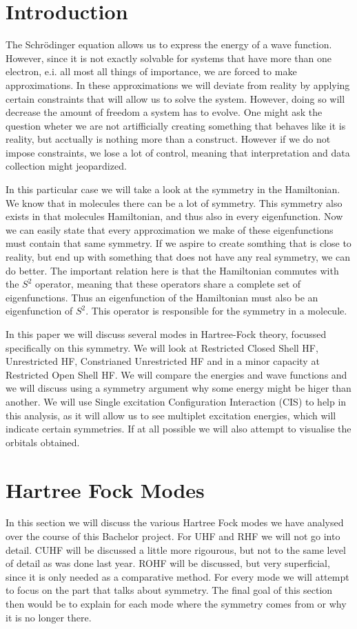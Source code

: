 \section{Introduction}
\label{sec:intro}
The Schrödinger equation allows us to express the energy of a wave function. However, since it is not exactly solvable for systems that 
have more than one electron, e.i. all most all things of importance, we are forced to make approximations. In these approximations we will
deviate from reality by applying certain constraints that will allow us to solve the system. However, doing so will decrease the amount
of freedom a system has to evolve. One might ask the question wheter we are not artifficially creating something that behaves like it is 
reality, but acctually is nothing more than a construct. However if we do not impose constraints, we lose a lot of control, meaning that 
interpretation and data collection might jeopardized. 

In this particular case we will take a look at the symmetry in the Hamiltonian. We know that in molecules there can be a lot of symmetry.
This symmetry also exists in that molecules Hamiltonian, and thus also in every eigenfunction. Now we can easily state that every 
approximation we make of these eigenfunctions must contain that same symmetry. If we aspire to create somthing that is close to reality,
but end up with something that does not have any real symmetry, we can do better. The important relation here is that the Hamiltonian 
commutes with the $S^2$ operator, meaning that these operators share a complete set of eigenfunctions. Thus an eigenfunction of the Hamiltonian must also
be an eigenfunction of $S^2$. This operator is responsible for the symmetry in a molecule.

In this paper we will discuss several modes in Hartree-Fock theory, focussed specifically on this symmetry. We will look at Restricted Closed
Shell HF, Unrestricted HF, Constrianed Unrestricted HF and in a minor capacity at Restricted Open Shell HF. We will compare the energies
and wave functions and we will discuss using a symmetry argument why some energy might be higer than another. We will use 
Single excitation Configuration Interaction (CIS) to help in this analysis, as it will allow us to see multiplet excitation energies, 
which will indicate certain symmetries. If at all possible we will also attempt to visualise the orbitals obtained. 

\section{Hartree Fock Modes}
In this section we will discuss the various Hartree Fock modes we have analysed over the course of this Bachelor project. For UHF and RHF we will not go into detail.
CUHF will be discussed a little more rigourous, but not to the same level of detail as was done last year. ROHF will be discussed, but very superficial, since it is
only needed as a comparative method. For every mode we will attempt to focus on the part that talks about symmetry. The final goal of this section then would be to
explain for each mode where the symmetry comes from or why it is no longer there.

